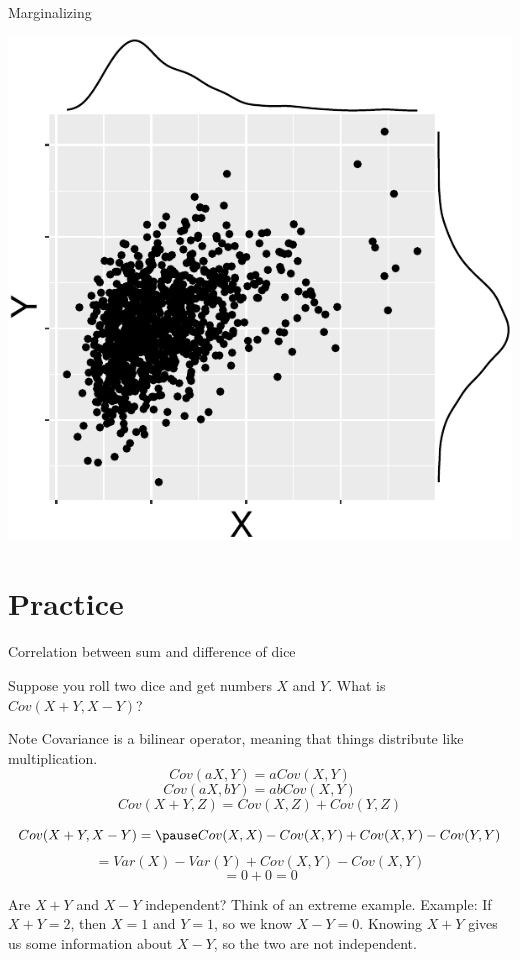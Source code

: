 \documentclass{beamer}
\begin{document}
\begin{frame}{Marginalizing}
\begin{center}\includegraphics[scale=.7]{figures/Marginal_dists.pdf}\end{center}
\end{frame}

\section{Practice}

\begin{frame}{Correlation between sum and difference of dice}
\begin{small}
Suppose you roll two dice and get numbers $X$ and $Y$. What is $Cov(X+Y,X-Y)$?
\pause
\begin{block}{Note}
Covariance is a \alert{bilinear} operator, meaning that things distribute like multiplication.
$$Cov(aX,Y)=aCov(X,Y)$$
$$Cov(aX,bY)=abCov(X,Y)$$
$$Cov(X+Y,Z)=Cov(X,Z)+Cov(Y,Z)$$
\end{block}
\pause
$$Cov(X+Y,X-Y)=\pause Cov(X,X)-Cov(X,Y)+Cov(X,Y)-Cov(Y,Y)$$
\pause
$$=Var(X)-Var(Y)+Cov(X,Y)-Cov(X,Y)$$
\pause
$$=0 + 0 = 0$$
\end{small}
\end{frame}

\begin{frame}
Are $X+Y$ and $X-Y$ independent? Think of an extreme example.
\pause
\newline
\newline
Example: If $X+Y=2$, then $X=1$ and $Y=1$, so we know $X-Y=0$. Knowing $X+Y$ gives us some information about $X-Y$, so the two are not independent.
\end{frame}
\end{document}
